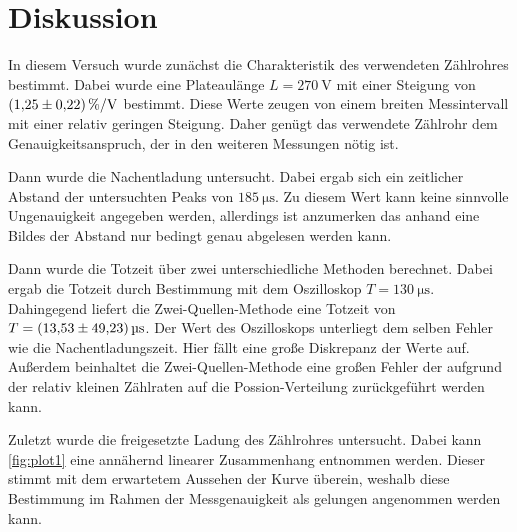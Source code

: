 \section{Diskussion}
\label{sec:Diskussion}
In diesem Versuch wurde zunächst die Charakteristik des verwendeten Zählrohres bestimmt. Dabei wurde eine Plateaulänge $L = \qty{270}{\volt}$ mit einer Steigung von 
$\qty{1.25+-0.22}{\percent\per\volt}$ bestimmt. Diese Werte zeugen von einem breiten Messintervall mit einer relativ geringen Steigung. Daher genügt das verwendete 
Zählrohr dem Genauigkeitsanspruch, der in den weiteren Messungen nötig ist.

Dann wurde die Nachentladung untersucht. Dabei ergab sich ein zeitlicher Abstand der untersuchten Peaks von $\qty{185}{\micro\second}$. Zu diesem Wert kann keine sinnvolle
Ungenauigkeit angegeben werden, allerdings ist anzumerken das anhand eine Bildes der Abstand nur bedingt genau abgelesen werden kann.  

Dann wurde die Totzeit über zwei unterschiedliche Methoden berechnet. Dabei ergab die Totzeit durch Bestimmung mit dem Oszilloskop $T = \qty{130}{\micro\second}$. Dahingegend
liefert die Zwei-Quellen-Methode eine Totzeit von $T = \qty{13.53 +-49.23}{\micro\second}$. Der Wert des Oszilloskops unterliegt dem selben Fehler wie die Nachentladungszeit.
Hier fällt eine große Diskrepanz der Werte auf. Außerdem beinhaltet die Zwei-Quellen-Methode eine großen Fehler der aufgrund der relativ kleinen Zählraten auf die 
Possion-Verteilung zurückgeführt werden kann.

Zuletzt wurde die freigesetzte Ladung des Zählrohres untersucht. Dabei kann \autoref{fig:plot1} eine annähernd linearer Zusammenhang entnommen werden. Dieser stimmt mit 
dem erwartetem Aussehen der Kurve überein, weshalb diese Bestimmung im Rahmen der Messgenauigkeit als gelungen angenommen werden kann.